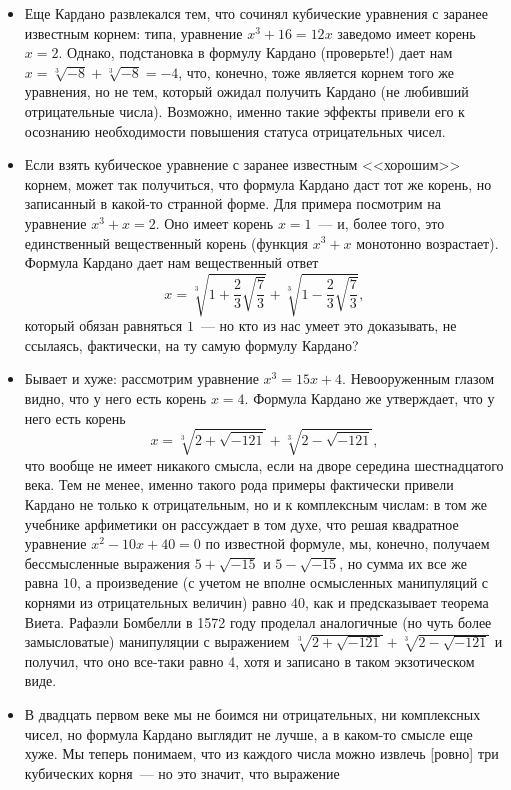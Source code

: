 \documentclass[a4paper,11pt]{scrartcl}
\theoremstyle{plain}
\theoremstyle{definition}
\begin{document}
\begin{itemize}
\item Еще Кардано развлекался тем, что сочинял кубические уравнения с
заранее известным корнем: типа, уравнение $x^3 + 16 = 12x$ заведомо
имеет корень $x=2$. Однако, подстановка в формулу Кардано (проверьте!)
дает нам $x = \sqrt[3]{-8} + \sqrt[3]{-8} = -4$, что, конечно, тоже
является корнем того же уравнения, но не тем, который ожидал получить
Кардано (не любивший отрицательные числа). Возможно, именно такие
эффекты привели его к осознанию необходимости повышения
статуса отрицательных чисел.
\item Если взять кубическое уравнение с заранее известным <<хорошим>>
корнем, может так получиться, что формула Кардано даст тот же корень,
но записанный в какой-то странной форме.
Для примера посмотрим на уравнение $x^3+x=2$.
Оно имеет корень $x=1$~--- и, более того, это единственный
вещественный корень (функция $x^3+x$ монотонно возрастает).
Формула Кардано дает нам вещественный ответ
$$
x = \sqrt[3]{1+\frac{2}{3}\sqrt{\frac{7}{3}}} +
\sqrt[3]{1-\frac{2}{3}\sqrt{\frac{7}{3}}},
$$
который обязан равняться $1$~--- но кто из нас умеет это доказывать,
не ссылаясь, фактически, на ту самую формулу Кардано?
\item Бывает и хуже: рассмотрим уравнение $x^3 = 15x + 4$.
Невооруженным глазом видно, что у него есть корень $x=4$.
Формула Кардано же утверждает, что у него есть корень
$$
x = \sqrt[3]{2+\sqrt{-121}} + \sqrt[3]{2-\sqrt{-121}},
$$
что вообще не имеет никакого смысла, если на дворе середина
шестнадцатого века.
Тем не менее, именно такого рода примеры фактически привели Кардано не
только к отрицательным, но и к комплексным числам: в том же учебнике
арфиметики он рассуждает в том духе, что решая квадратное уравнение
$x^2 - 10x + 40 = 0$ по известной формуле, мы, конечно, получаем
бессмысленные выражения $5 + \sqrt{-15}$ и $5 - \sqrt{-15}$,
но сумма их все же равна $10$, а произведение
(с учетом не вполне осмысленных манипуляций с корнями из отрицательных
величин) равно $40$, как и предсказывает теорема Виета.
Рафаэли Бомбелли в 1572 году проделал аналогичные (но чуть более
замысловатые) манипуляции с выражением
$\sqrt[3]{2+\sqrt{-121}} + \sqrt[3]{2-\sqrt{-121}}$ и получил,
что оно все-таки равно $4$, хотя и записано в таком экзотическом виде.
\item В двадцать первом веке мы не боимся ни отрицательных, ни
комплексных чисел, но формула Кардано выглядит не лучше, а в каком-то
смысле еще хуже. Мы теперь понимаем, что из каждого числа можно
извлечь [ровно] три кубических корня~--- но это значит, что выражение

\end{itemize}
\end{document}
